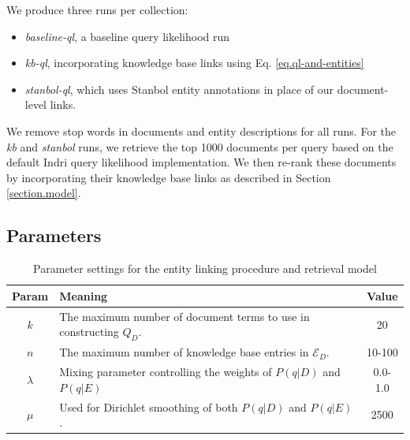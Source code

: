 \documentclass{sig-alternate}
\begin{document}

We produce three runs per collection:
\begin{itemize}
	\item \textit{baseline-ql}, a baseline query likelihood run
	\item \textit{kb-ql}, incorporating knowledge base links using Eq. \ref{eq.ql-and-entities}
	\item \textit{stanbol-ql}, which uses Stanbol entity annotations in place of our document-level links.
\end{itemize}

We remove stop words in documents and entity descriptions for all runs. For the \textit{kb} and \textit{stanbol} runs, we retrieve the top 1000 documents per query based on the default Indri query likelihood implementation. We then re-rank these documents by incorporating their knowledge base links as described in Section \ref{section.model}.

\subsection{Parameters}\label{section.evaluation.parameters}

\begin{table}[htbp]
\centering
\begin{tabular}{|c|p{}|c|} \hline
{\bf Param} & {\bf Meaning} & {\bf Value} \\ \hline
$k$ & The maximum number of document terms to use in constructing $Q_D$. & 20 \\ \hline
$n$ & The maximum number of knowledge base entries in $\mathcal{E}_D$. & 10-100 \\ \hline
$\lambda$ & Mixing parameter controlling the weights of $P(q|D)$ and $P(q|E)$ & 0.0-1.0 \\ \hline
$\mu$ & Used for Dirichlet smoothing of both $P(q|D)$ and $P(q|E)$. & 2500 \\ \hline
\end{tabular}
\caption{Parameter settings for the entity linking procedure and retrieval model}
\label{table.parameters}
\end{table}
\end{document}

